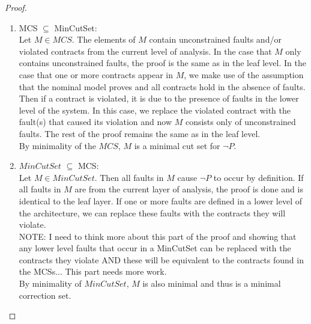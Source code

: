 \begin{theorem}
\begin{proof}
\begin{enumerate}[label=(\roman*)]
\item MCS $\subseteq$ MinCutSet: \\

Let $M \in  MCS$. The elements of $M$ contain unconstrained faults and/or violated contracts from the current level of analysis. In the case that $M$ only contains unconstrained faults, the proof is the same as in the leaf level. In the case that one or more contracts appear in $M$, we make use of the assumption that the nominal model proves and all contracts hold in the absence of faults. Then if a contract is violated, it is due to the presence of faults in the lower level of the system. In this case, we replace the violated contract with the fault(s) that caused its violation and now $M$ consists only of unconstrained faults. The rest of the proof remains the same as in the leaf level. \\

By minimality of the $MCS$, $M$ is a minimal cut set for $ \neg P $.  \\

\item $MinCutSet $ $\subseteq$ MCS: \\

Let $M \in MinCutSet$. Then all faults in $M$ cause $ \neg P $ to occur by definition. If all faults in $M$ are from the current layer of analysis, the proof is done and is identical to the leaf layer. If one or more faults are defined in a lower level of the architecture, we can replace these faults with the contracts they will violate. \\

NOTE: I need to think more about this part of the proof and showing that any lower level faults that occur in a MinCutSet can be replaced with the contracts they violate AND these will be equivalent to the contracts found in the MCSs... This part needs more work. \\

By minimality of $MinCutSet$, $M$ is also minimal and thus is a minimal correction set.



\end{enumerate}
\end{proof}
\end{theorem}





\iffalse

